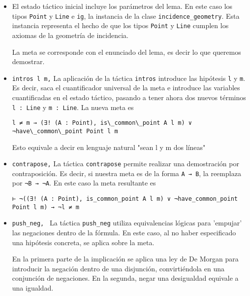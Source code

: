 \begin{itemize}

    \item El estado táctico inicial incluye los parámetros del lema. En este
        caso los tipos \lstinline{Point} y \lstinline{Line} e \lstinline{ig}, la instancia de la clase
        \lstinline{incidence_geometry}. Esta instancia representa el hecho de que los tipos
        \lstinline{Point} y \lstinline{Line} cumplen los axiomas de la geometría de incidencia. 

        La meta se corresponde con el enunciado del lema, es decir lo que
        queremos demostrar.

    \item \lstinline{intros l m,} La aplicación de la táctica \lstinline{intros} introduce
        las hipótesis \lstinline{l} y \lstinline{m}. Es decir, saca el
        cuantificador universal de la meta e introduce las variables
        cuantificadas en el estado táctico, pasando a tener ahora dos nuevos
        términos \lstinline{l : Line} y \lstinline{m : Line}. La nueva meta es 
        \begin{lstlisting}
l ≠ m → (∃! (A : Point), is\_common\_point A l m) ∨ ¬have\_common\_point Point l m
        \end{lstlisting}
        Esto equivale a decir en lenguaje natural "sean l y m dos líneas"

    \item \lstinline{contrapose,} La táctica \lstinline{contrapose} permite realizar una
        demostración por contraposición. Es decir, si nuestra meta es de la
        forma \lstinline{A → B}, la reemplaza por \lstinline{¬B → ¬A}. En este 
        caso la meta resultante es 
        \begin{lstlisting}
⊢ ¬((∃! (A : Point), is_common_point A l m) ∨ ¬have_common_point Point l m) → ¬l ≠ m
        \end{lstlisting}

    \item \lstinline{push_neg, } La táctica \lstinline{push_neg} utiliza equivalencias
        lógicas para 'empujar' las negaciones dentro de la fórmula. En este
        caso, al no haber especificado una hipótesis concreta, se aplica sobre
        la meta.

        En la primera parte de la implicación se aplica una ley de De Morgan
        para introducir la negación dentro de una disjunción, convirtiéndola en
        una conjunción de negaciones. En la segunda, negar una desigualdad
        equivale a una igualdad.


\end{itemize}
